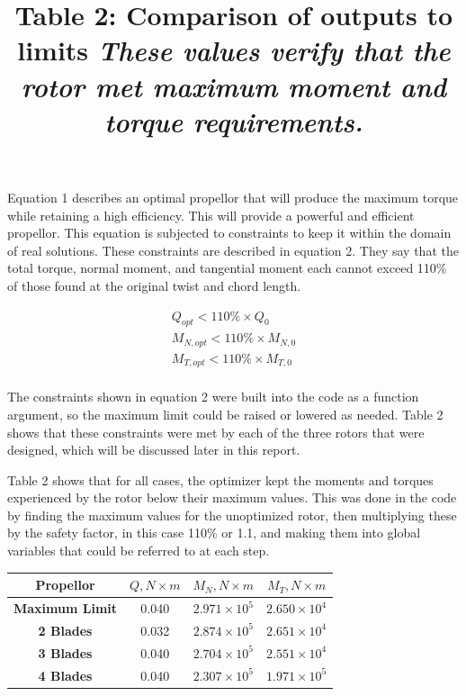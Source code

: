 \documentclass{article}
\begin{document}
\raggedright

Equation 1 describes an optimal propellor that will produce the maximum torque while retaining a high efficiency. This will provide a powerful and efficient propellor. This equation is subjected to constraints to keep it within the domain of real solutions. These constraints are described in equation 2. They say that the total torque, normal moment, and tangential moment each cannot exceed 110\% of those found at the original twist and chord length. \newline

\begin{equation}
\begin{aligned}
	Q_{opt} < 110\% \times Q_{0} \\
	M_{N,opt} < 110\% \times M_{N,0} \\
	M_{T,opt} < 110\% \times M_{T,0} \\
\end{aligned}
\end{equation} \newline

The constraints shown in equation 2 were built into the code as a function argument, so the maximum limit could be raised or lowered as needed. Table 2 shows that these constraints were met by each of the three rotors that were designed, which will be discussed later in this report. \newline

Table 2 shows that for all cases, the optimizer kept the moments and torques experienced by the rotor below their maximum values. This was done in the code by finding the maximum values for the unoptimized rotor, then multiplying these by the safety factor, in this case 110\% or 1.1, and making them into global variables that could be referred to at each step. \newline

\centering
\title{Table 2: Comparison of outputs to limits \newline}
\title{\emph{These values verify that the rotor met maximum moment and torque requirements.}} \label{table:2} \newline
\begin{tabular}{| c | c | c | c |}
	 \hline
  	 \textbf{Propellor} & \textbf{$Q, N \times m$} & \textbf{$M_{N}, N \times m$} & \textbf{$M_{T}, N \times m$} \\ \hline
	 \textbf{Maximum Limit} & 0.040 & $2.971 \times 10^{5}$ & $2.650 \times 10^{4}$ \\
	 \textbf{2 Blades} & 0.032 & $2.874 \times 10^{5}$ & $2.651 \times 10^{4}$ \\
	 \textbf{3 Blades} & 0.040 & $2.704 \times 10^{5}$ & $2.551 \times 10^{4}$ \\
	 \textbf{4 Blades} & 0.040 & $2.307 \times 10^{5}$ & $1.971 \times 10^{5}$ \\ \hline
\end{tabular} \break \newline
\end{document}
